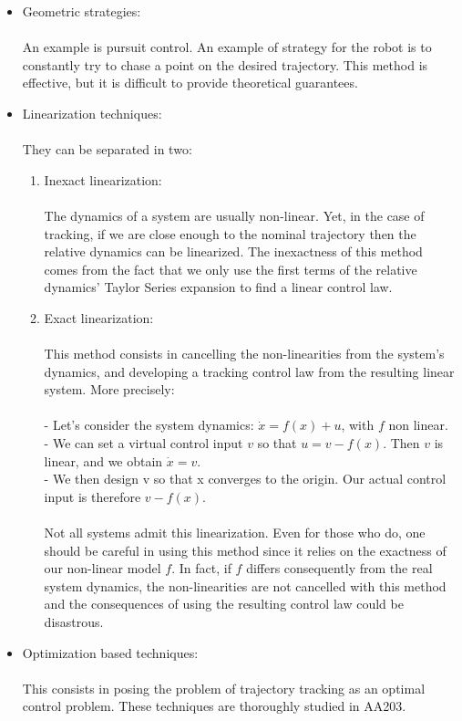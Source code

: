 ﻿\documentclass[twoside]{article}
\begin{document}
\begin{itemize}
  \item Geometric strategies: \\
  \\ An example is pursuit control. An example of strategy for the robot is to constantly try to chase a point on the desired trajectory. This method is effective, but it is difficult to provide theoretical guarantees.
  \item Linearization techniques: \\
  \\ They can be separated in two:
  \begin{enumerate}
    \item Inexact linearization: \\
    \\
    The dynamics of a system are usually non-linear. Yet, in the case of tracking, if we are close enough to the nominal trajectory then the relative dynamics can be linearized. The inexactness of this method comes from the fact that we only use the first terms of the relative dynamics' Taylor Series expansion to find a linear control law.
    \\
    \item Exact linearization: \\
    \\
    This method consists in cancelling the non-linearities from the system's dynamics, and developing a tracking control law from the resulting linear system. More precisely: \\
    \\
    - Let's consider the system dynamics: $\dot{x} = f(x) + u$, with $f$ non linear.\\
     - We can set a virtual control input $v$ so that $u = v - f(x)$. Then $v$ is linear, and we obtain $\dot{x} = v$. \\
     - We then design v so that x converges to the origin. Our actual control input is therefore $v - f(x)$. \\
     \\
     Not all systems admit this linearization. Even for those who do, one should be careful in using this method since it relies on the exactness of our non-linear model $f$. In fact, if $f$ differs consequently from the real system dynamics, the non-linearities are not cancelled with this method and the consequences of using the resulting control law could be disastrous.
  \end{enumerate}
  \item Optimization based techniques: \\
  \\
  This consists in posing the problem of trajectory tracking as an optimal control problem. These techniques are thoroughly studied in AA203.
\end{itemize}
\end{document}
